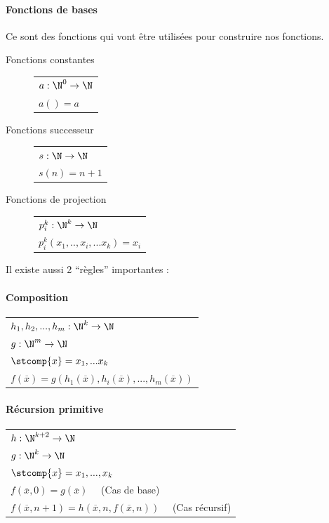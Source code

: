 \paragraph{Fonctions de bases} Ce sont des fonctions qui vont être utilisées
pour construire nos fonctions.

\begin{description}
	\item[Fonctions constantes]
		\begin{tabular}{|l|}
			\hline
			$a: \N^0 \rightarrow \N$\\
			$a() = a$\\
			\hline
		\end{tabular}
	\item[Fonctions successeur]
		\begin{tabular}{|l|}
			\hline
			$s: \N \rightarrow \N$\\
			$s(n) = n + 1$\\
			\hline
		\end{tabular}
	\item[Fonctions de projection]
		\begin{tabular}{|l|}
			\hline
			$p^k_i: \N^k \rightarrow \N$\\
			$p^k_i(x_1,..,x_i,...x_k) = x_i$\\
			\hline
		\end{tabular}
\end{description}

Il existe aussi 2 ``règles'' importantes :
\paragraph{Composition}
\begin{tabular}{|l|}
	\hline
	$h_1, h_2,...,h_m: \N^k \rightarrow \N$\\
	$g: \N^m \rightarrow \N$\\
	$\stcomp{x} =x_1,...x_k$ \\
	$f(\overline{x}) =
	g(h_1(\overline{x}),h_i(\overline{x}),...,h_m(\overline{x}))$\\
	\hline
\end{tabular}

\paragraph{Récursion primitive}
\begin{tabular}{|l|}
	\hline
	$h: \N^{k+2} \rightarrow \N$\\
	$g: \N^k \rightarrow \N$\\
	$\stcomp{x} =x_1,...,x_k$ \\
	$f(\overline{x}, 0) = g(\overline{x}) \quad$ (Cas de base)\\
	$f(\overline{x}, n+1) =
	h(\overline{x},n, f(\overline{x}, n))\quad$ (Cas récursif)\\
	\hline
\end{tabular}

